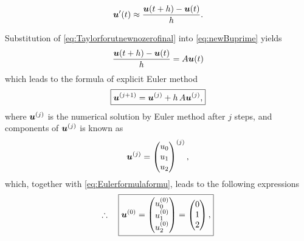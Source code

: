 \documentclass[12pt]{article}
\begin{document}
\begin{enumerate}[i)]
\begin{observationboxed}
\begin{align}
{				      {\boldsymbol{\mathnormal u}}'(t) 
				      \approx \frac{{\boldsymbol{\mathnormal u}}(t+h) - {\boldsymbol{\mathnormal u}}(t)}{h}.
			      }
		      \end{align}
	      \end{observationboxed}
	      Substitution of 
	      \eqref{eq:Taylorforutnewnozerofinal}
	      into \eqref{eq:newBuprime} yields
	      \begin{align}
		      \frac{{\boldsymbol{\mathnormal u}}(t+h) - {\boldsymbol{\mathnormal u}}(t)}{h}
		      = A{\boldsymbol{\mathnormal u}}(t)
	      \end{align}
	      which leads to the formula of explicit Euler method 
	      \begin{align}
		      \label{eq:Eulerformulaformu}
		      \boxed{
			      {\boldsymbol{\mathnormal u}}^{(j+1)} = {\boldsymbol{\mathnormal u}}^{(j)} + h\,A{\boldsymbol{\mathnormal u}}^{(j)},
		      }
	      \end{align}
	      where ${\boldsymbol{\mathnormal u}}^{(j)}$ is the numerical solution by
	      Euler method after $j$ steps,
	      and components of ${\boldsymbol{\mathnormal u}}^{(j)}$ is known as 
	      \begin{align}
		      {\boldsymbol{\mathnormal u}}^{(j)}
		      = 
		      \begin{pmatrix} 
			      u_0 \\u_1 \\u_2
		      \end{pmatrix}^{(j)},
	      \end{align}
	      which, together with 
	      \eqref{eq:Eulerformulaformu}, 
	      leads to the following expressions
	      \begin{align}
		      \therefore\quad
		      \boxed{
			      \begin{aligned}
				      \Bu^{(0)} & =
				      \begin{pmatrix} 
					      u_0^{(0)} \\u_1^{(0)} \\u_2^{(0)}
				      \end{pmatrix}
				      =
				      \begin{pmatrix}
					      0 \\1\\2
				      \end{pmatrix},              \\

\end{aligned}}
\end{align}
\end{enumerate}
\end{document}
